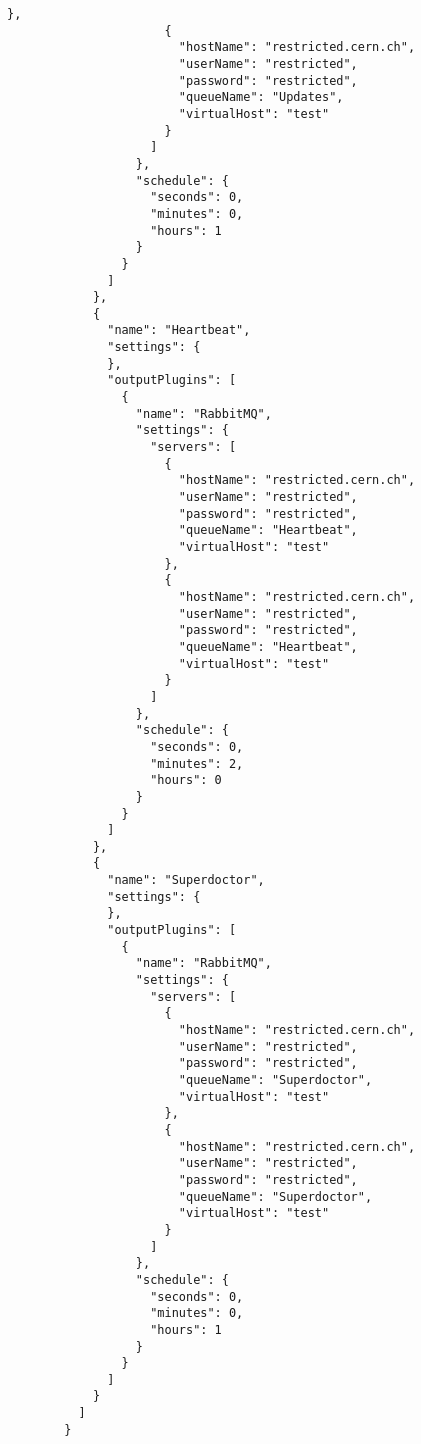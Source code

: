 \begin{lstlisting}[style=csharp, caption=Fichero de configuración]
                      },
                      {
                        "hostName": "restricted.cern.ch",
                        "userName": "restricted",
                        "password": "restricted",
                        "queueName": "Updates",
                        "virtualHost": "test"
                      }
                    ]
                  },
                  "schedule": {
                    "seconds": 0,
                    "minutes": 0,
                    "hours": 1
                  }
                }
              ]
            },
            {
              "name": "Heartbeat",
              "settings": {
              },
              "outputPlugins": [
                {
                  "name": "RabbitMQ",
                  "settings": {
                    "servers": [
                      {
                        "hostName": "restricted.cern.ch",
                        "userName": "restricted",
                        "password": "restricted",
                        "queueName": "Heartbeat",
                        "virtualHost": "test"
                      },
                      {
                        "hostName": "restricted.cern.ch",
                        "userName": "restricted",
                        "password": "restricted",
                        "queueName": "Heartbeat",
                        "virtualHost": "test"
                      }
                    ]
                  },
                  "schedule": {
                    "seconds": 0,
                    "minutes": 2,
                    "hours": 0
                  }
                }
              ]
            },
            {
              "name": "Superdoctor",
              "settings": {
              },
              "outputPlugins": [
                {
                  "name": "RabbitMQ",
                  "settings": {
                    "servers": [
                      {
                        "hostName": "restricted.cern.ch",
                        "userName": "restricted",
                        "password": "restricted",
                        "queueName": "Superdoctor",
                        "virtualHost": "test"
                      },
                      {
                        "hostName": "restricted.cern.ch",
                        "userName": "restricted",
                        "password": "restricted",
                        "queueName": "Superdoctor",
                        "virtualHost": "test"
                      }
                    ]
                  },
                  "schedule": {
                    "seconds": 0,
                    "minutes": 0,
                    "hours": 1
                  }
                }
              ]
            }
          ]
        }
    \end{lstlisting}